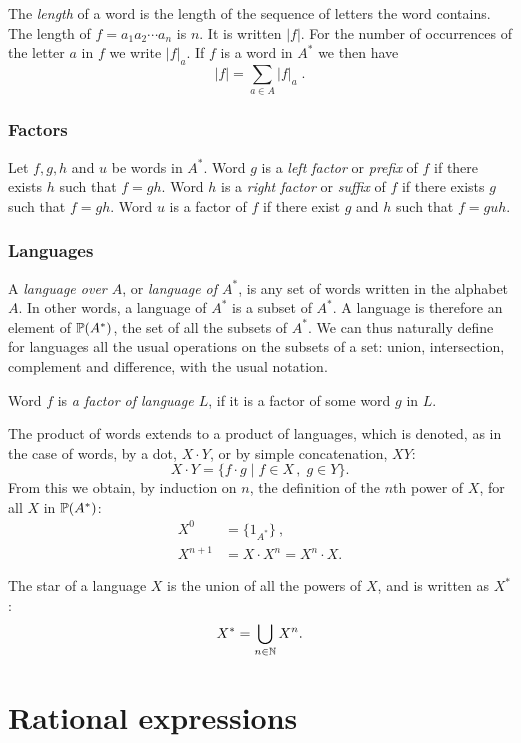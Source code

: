 The \emph{length} of a word is the length of the sequence of letters the word contains. The length of $f = a_1 a_2 \dotsm a_n$ is $n$. It is written $|f|$. For the number of occurrences of the letter $a$ in $f$ we write $|f|_a$. If $f$ is a word in $A^*$ we then have
\[
    |f| = \sum_{a \in A} |f|_a \; .
\]

\subsubsection*{Factors}

Let $f, g, h$ and $u$ be words in $A^*$. Word $g$ is a \emph{left factor} or \emph{prefix} of $f$ if there exists $h$ such that $f = g h$. Word $h$ is a \emph{right factor} or \emph{suffix} of $f$ if there exists $g$ such that $f = g h$. Word $u$ is a factor of $f$ if there exist $g$ and $h$ such that $f = g u h$.

\subsubsection*{Languages}

A \emph{language over $A$}, or \emph{language of $A^*$}, is any set of words written in the alphabet $A$. In other words, a language of $A^*$ is a subset of $A^*$. A language is therefore an element of $\mathbb{P}(A^*)$, the set of all the subsets of $A^*$. We can thus naturally define for languages all the usual operations on the subsets of a set: union, intersection, complement and difference, with the usual notation.

Word $f$ is \emph{a factor of language $L$}, if it is a factor of some word $g$ in $L$.

The product of words extends to a product of languages, which is denoted, as in the case of words, by a dot, $X \cdot Y$, or by simple concatenation, $X Y$:
\[
    X \cdot Y = \{ f \cdot g \mid f \in X \, , \; g \in Y \}.
\]
From this we obtain, by induction on $n$, the definition of the $n$th power of $X$, for all $X$ in $\mathbb{P}(A^*)$:
\begin{align*}
    X^0 &= \{1_{A^*}\} \: ,\\
    X^{n+1} &= X \cdot X^n = X^n \cdot X.
\end{align*}

The star of a language $X$ is the union of all the powers of $X$, and is written as $X^*$:
\[
    X^* = \bigcup_{n \in \mathbb{N}} X^n.
\]

\section{Rational expressions}

